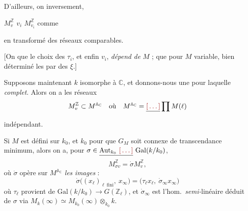 \documentclass[11pt,a4paper]{article}
\begin{document}
D'ailleurs, on \ill{} inversement, \ill{}


$M^{\mathbb{Z}}_{v}$ \ill{} $v_{i}$ \ill{} $M^{\mathbb{Z}}_{v_{i}}$ \ill{}
comme \ill{}

\ill{} \ill{} en transformé des réseaux \ill{} comparables.

[On \ill{} que le choix des $\tau_{i}$, et enfin $v_{i}$,
\emph{dépend de $M$} ; \ill{} que pour $M$ variable, \ill{} bien déterminé les
\ill{} par des \ill{} $\xi$.]


Supposons maintenant $k$ isomorphe à $\mathbb{C}$, et donnons-nous une \ill{}
pour laquelle \ill{} \emph{complet}. Alors on a \ill{} les réseaux
\[
  M^{\mathbb{Z}}_{v} \subset M^{\mathbb{A}_{\mathbb{C}}}
  \quad\text{où}\quad
  M^{\mathbb{A}_{\mathbb{C}}} = \struck{\ill{}} \prod M(\ell)
\]
\ill{} indépendant.

 Si $M$ est défini sur \ill{} $k_{0}$, et $k_{0}$
\ill{} pour \ill{} que $G_{M}$ soit connexe \ill{} \ill{} de transcendance
\struck{\ill{}} \ill{} minimum, \ill{} alors \struck{\ill{}} on a, pour
$\sigma \in \struck{\mathrm{Aut}_{k_{0}}\ \ill{}}\ \mathrm{Gal}(k/k_{0})$,
\[
  M^{\mathbb{Z}}_{\sigma v} = \dot\sigma M^{\mathbb{Z}}_{v} ,
\]
où $\dot\sigma$ opère sur $M^{\mathbb{A}_{\mathbb{C}}}$ \ill{} \emph{les
images} \ill{} :
\[
  \dot\sigma\bigl((x_{\ell})_{\ell\ \mathrm{fini}},\ x_{\infty}\bigr)
  = \bigl(\tau_{\ell} x_{\ell},\ \dot\sigma_{\infty} x_{\infty}\bigr)
\]
où $\tau_{\ell}$ provient de $\mathrm{Gal}(k/k_{0}) \to G(\mathbb{Z}_{\ell})$,
et $\dot\sigma_{\infty}$ est l'hom.\ \emph{semi-}linéaire déduit de $\sigma$ via
$M_{k}(\infty) \simeq M_{k_{0}}(\infty) \otimes_{k_{0}} k$.
\end{document}
